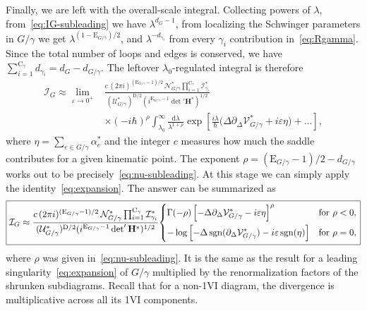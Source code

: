 \documentclass[12pt]{article}
\numberwithin{figure}{section}
\DeclareMathOperator{\sgn}{sgn}
\def \be {\begin{equation}}
\def \ee {\end{equation}}
\def \nn {\nonumber}
\def \CC {C}
\def \D {\mathrm{D}}
\def \E {\mathrm{E}}
\def \U {\mathcal{U}}
\def \d {\mathrm{d}}
\def \eps {\varepsilon}
\def \V {\mathcal{V}}
\def \CC {\mathrm{C}}
\def \I {\mathcal{I}}
\def \N {\mathcal{N}}
\def \RR {\mathcal{I}^\ast}
\def \upgamma {\rho}
\begin{document}
				Finally, we are left with the overall-scale integral. Collecting powers of $\lambda$, from~\eqref{eq:IG-subleading} we have $\lambda^{d_G-1}$, from localizing the Schwinger parameters in $G/\gamma$ we get $\lambda^{(1-\E_{G/\gamma})/2}$, and $\lambda^{-d_{\gamma_i}}$ from every $\gamma_i$ contribution in~\eqref{eq:Rgamma}. Since the total number of loops and edges is conserved, we have $\sum_{i=1}^{\CC_\gamma} d_{\gamma_i} = d_{G} - d_{G/\gamma}$. The leftover $\lambda_0$-regulated integral is therefore
            	\begin{align}
            	\I_G \approx \lim_{\eps \to 0^+} &\frac{c\, (2\pi i)^{(\E_{G/\gamma}-1)/2}\, \N_{G/\gamma}^\ast \prod_{i=1}^{\CC_\gamma} \RR_{\gamma_i}}{(\U_{G/\gamma}^\ast)^{\D/2} (i^{\E_{G/\gamma}-1} \det' \mathbf{H}^\ast)^{1/2}}\\
            	&\times (-i\hbar)^{\upgamma}  \int_{\lambda_0}^\infty \frac{\d\lambda}{\lambda^{1+\upgamma}} \exp \left[ \frac{i\lambda}{\hbar} \bigg(\Delta \partial_\Delta \V_{G/\gamma}^\ast + i\eps \eta\bigg) + \ldots \right],\nn
            	\end{align}
				where $\eta = \sum_{e \in G/\gamma} \alpha_e^\ast$ and the integer $c$ measures how much the saddle contributes for a given kinematic point. The exponent $\upgamma = (\E_{G/\gamma} - 1)/2 - d_{G/\gamma}$ works out to be precisely~\eqref{eq:nu-subleading}. At this stage we can simply apply the identity~\eqref{eq:expansion}. The answer can be summarized as
				\be\label{eq:subleading-expansion}
				\boxed{
        		\I_G \approx \frac{c\,(2\pi i)^{(\E_{G/\gamma}-1)/2}\, \N_{G/\gamma}^\ast \prod_{i=1}^{\CC_\gamma} \RR_{\gamma_i}}{(\U_{G/\gamma}^\ast)^{\D/2} (i^{\E_{G/\gamma}-1} \det' \mathbf{H}^\ast)^{1/2}} \!\begin{dcases}
        			\Gamma(-\upgamma) \left[-\Delta \partial_\Delta \V_{G/\gamma}^\ast - i\eps \eta \right]^\upgamma  &\text{for } \upgamma < 0,\\
        			- \log \left[-\Delta \sgn(\partial_\Delta \V_{G/\gamma}^\ast) - i\eps \sgn(\eta) \right]  &\text{for } \upgamma = 0,
        		\end{dcases}}
        		\ee
        		where $\upgamma$ was given in~\eqref{eq:nu-subleading}.
				It is the same as the result for a leading singularity~\eqref{eq:expansion} of $G/\gamma$  multiplied by the renormalization factors of the shrunken subdiagrams. Recall that for a non-1VI diagram, the divergence is multiplicative across all its 1VI components.
				
				
				
\end{document}
